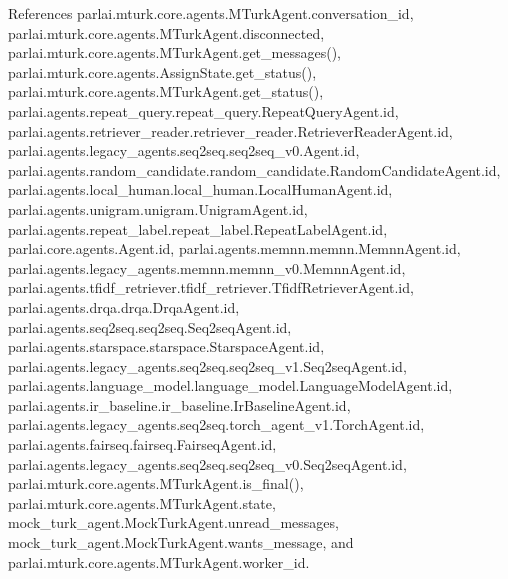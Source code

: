 References parlai.\+mturk.\+core.\+agents.\+M\+Turk\+Agent.\+conversation\+\_\+id, parlai.\+mturk.\+core.\+agents.\+M\+Turk\+Agent.\+disconnected, parlai.\+mturk.\+core.\+agents.\+M\+Turk\+Agent.\+get\+\_\+messages(), parlai.\+mturk.\+core.\+agents.\+Assign\+State.\+get\+\_\+status(), parlai.\+mturk.\+core.\+agents.\+M\+Turk\+Agent.\+get\+\_\+status(), parlai.\+agents.\+repeat\+\_\+query.\+repeat\+\_\+query.\+Repeat\+Query\+Agent.\+id, parlai.\+agents.\+retriever\+\_\+reader.\+retriever\+\_\+reader.\+Retriever\+Reader\+Agent.\+id, parlai.\+agents.\+legacy\+\_\+agents.\+seq2seq.\+seq2seq\+\_\+v0.\+Agent.\+id, parlai.\+agents.\+random\+\_\+candidate.\+random\+\_\+candidate.\+Random\+Candidate\+Agent.\+id, parlai.\+agents.\+local\+\_\+human.\+local\+\_\+human.\+Local\+Human\+Agent.\+id, parlai.\+agents.\+unigram.\+unigram.\+Unigram\+Agent.\+id, parlai.\+agents.\+repeat\+\_\+label.\+repeat\+\_\+label.\+Repeat\+Label\+Agent.\+id, parlai.\+core.\+agents.\+Agent.\+id, parlai.\+agents.\+memnn.\+memnn.\+Memnn\+Agent.\+id, parlai.\+agents.\+legacy\+\_\+agents.\+memnn.\+memnn\+\_\+v0.\+Memnn\+Agent.\+id, parlai.\+agents.\+tfidf\+\_\+retriever.\+tfidf\+\_\+retriever.\+Tfidf\+Retriever\+Agent.\+id, parlai.\+agents.\+drqa.\+drqa.\+Drqa\+Agent.\+id, parlai.\+agents.\+seq2seq.\+seq2seq.\+Seq2seq\+Agent.\+id, parlai.\+agents.\+starspace.\+starspace.\+Starspace\+Agent.\+id, parlai.\+agents.\+legacy\+\_\+agents.\+seq2seq.\+seq2seq\+\_\+v1.\+Seq2seq\+Agent.\+id, parlai.\+agents.\+language\+\_\+model.\+language\+\_\+model.\+Language\+Model\+Agent.\+id, parlai.\+agents.\+ir\+\_\+baseline.\+ir\+\_\+baseline.\+Ir\+Baseline\+Agent.\+id, parlai.\+agents.\+legacy\+\_\+agents.\+seq2seq.\+torch\+\_\+agent\+\_\+v1.\+Torch\+Agent.\+id, parlai.\+agents.\+fairseq.\+fairseq.\+Fairseq\+Agent.\+id, parlai.\+agents.\+legacy\+\_\+agents.\+seq2seq.\+seq2seq\+\_\+v0.\+Seq2seq\+Agent.\+id, parlai.\+mturk.\+core.\+agents.\+M\+Turk\+Agent.\+is\+\_\+final(), parlai.\+mturk.\+core.\+agents.\+M\+Turk\+Agent.\+state, mock\+\_\+turk\+\_\+agent.\+Mock\+Turk\+Agent.\+unread\+\_\+messages, mock\+\_\+turk\+\_\+agent.\+Mock\+Turk\+Agent.\+wants\+\_\+message, and parlai.\+mturk.\+core.\+agents.\+M\+Turk\+Agent.\+worker\+\_\+id.

